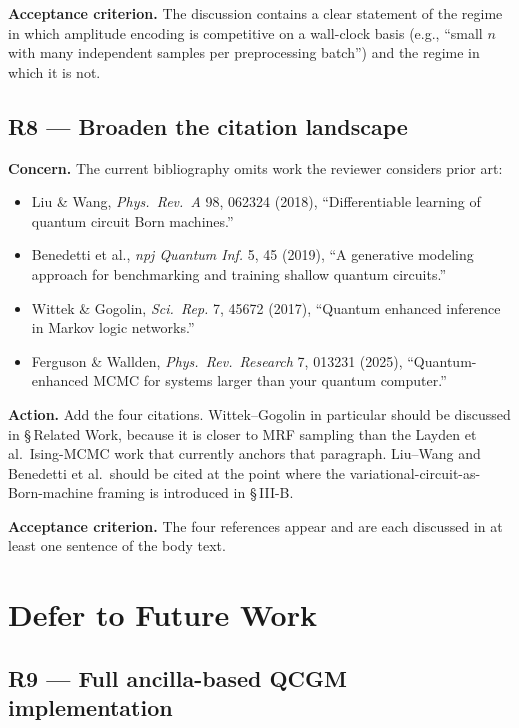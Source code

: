 \documentclass[conference,10pt]{IEEEtran}
\begin{document}
\textbf{Acceptance criterion.} The discussion contains a clear statement
of the regime in which amplitude encoding is competitive on a wall-clock
basis (e.g., ``small $n$ with many independent samples per preprocessing
batch'') and the regime in which it is not.

\subsection{R8 --- Broaden the citation landscape}

\textbf{Concern.} The current bibliography omits work the reviewer
considers prior art:
\begin{itemize}[leftmargin=*]
    \item Liu \& Wang, \emph{Phys.~Rev.~A} 98, 062324 (2018), ``Differentiable
    learning of quantum circuit Born machines.''
    \item Benedetti et al., \emph{npj Quantum Inf.} 5, 45 (2019),
    ``A generative modeling approach for benchmarking and training shallow
    quantum circuits.''
    \item Wittek \& Gogolin, \emph{Sci.~Rep.} 7, 45672 (2017),
    ``Quantum enhanced inference in Markov logic networks.''
    \item Ferguson \& Wallden, \emph{Phys.~Rev.~Research} 7, 013231 (2025),
    ``Quantum-enhanced MCMC for systems larger than your quantum computer.''
\end{itemize}

\textbf{Action.} Add the four citations. Wittek--Gogolin in particular
should be discussed in \S\,Related Work, because it is closer to MRF
sampling than the Layden et al.\ Ising-MCMC work that currently anchors
that paragraph. Liu--Wang and Benedetti et al.\ should be cited at the
point where the variational-circuit-as-Born-machine framing is introduced
in \S\,III-B.

\textbf{Acceptance criterion.} The four references appear and are each
discussed in at least one sentence of the body text.

\section{Defer to Future Work}

\subsection{R9 --- Full ancilla-based QCGM implementation}
\end{document}
